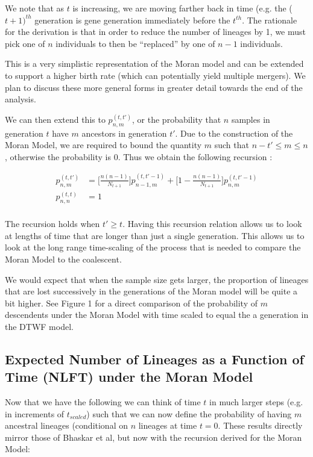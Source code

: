 \documentclass[11pt]{article}
\begin{document}
We note that as $t$ is increasing, we are moving farther back in time (e.g. the ($t+1)^{th}$ generation is gene generation immediately before the $t^{th}$. The rationale for the derivation is that in order to reduce the number of lineages by 1, we must pick one of $n$ individuals to then be ``replaced'' by one of $n-1$ individuals. 

This is a very simplistic representation of the Moran model and can be extended to support a higher birth rate (which can potentially yield multiple mergers). We plan to discuss these more general forms in greater detail towards the end of the analysis. 

We can then extend this to $p^{(t, t')}_{n,m}$, or the probability that $n$ samples in generation $t$ have $m$  ancestors in generation $t'$. Due to the construction of the Moran Model, we are required to bound the quantity $m$ such that $n-t' \leq m \leq n$, otherwise the probability is $0$. Thus we obtain the following recursion :

$$
\begin{aligned}
	p^{(t, t')}_{n,m} &= \Bigg[\frac{n(n-1)}{N_{t+1}}\Bigg] p^{(t, t'-1)}_{n-1, m} + \Bigg[1 - \frac{n(n-1)}{N_{t+1}}\Bigg] p^{(t, t'-1)}_{n,m}\\
	p^{(t, t)}_{n,n} &= 1\\
\end{aligned}
$$

The recursion holds when $t' \geq t$. Having this recursion relation allows us to look at lengths of time that are longer than just a single generation. This allows us to look at the long range time-scaling of the process that is needed to compare the Moran Model to the coalescent.  

We would expect that when the sample size gets larger, the proportion of lineages that are lost successively in the generations of the Moran model will be quite a bit higher. See Figure 1 for a direct comparison of the probability of $m$ descendents under the Moran Model with time scaled to equal the a generation in the DTWF model. 

\subsection{Expected Number of Lineages as a Function of Time (NLFT) under the Moran Model}

Now that we have the following we can think of time $t$ in much larger steps (e.g. in increments of $t_{scaled}$) such that we can now define the probability of having $m$ ancestral lineages (conditional on $n$ lineages at time $t = 0$. These results directly mirror those of Bhaskar et al, but now with the recursion derived for the Moran Model:
\end{document}
